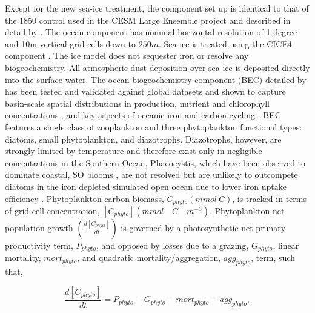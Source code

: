 Except for the new sea-ice treatment, the component set up is identical to that of the 1850 control used in the CESM Large Ensemble project and described in detail by \textcite{KayCommunityEarthSystem2014}. The ocean component has nominal horizontal resolution of 1 degree and 10m vertical grid cells down to $250m$. Sea ice is treated using the CICE4 component \parencite{HunkeCICEAlamosSea2008}. The ice model does not sequester iron or resolve any biogeochemistry. All atmospheric dust deposition over sea ice is deposited directly into the surface water.  
The ocean biogeochemistry component (BEC) detailed by \parencite{MooreMarineEcosystemDynamics2013} has been tested and validated against global datasets and shown to capture basin-scale spatial distributions in production, nutrient and chlorophyll concentrations 
\parencite{DoneySkillmetricsconfronting2009g, MooreUpperoceanecosystem2004,MooreMarineEcosystemDynamics2013,MooreProcessespatternsoceanic2013}, and key aspects of oceanic iron \parencite{MooreSedimentarymineraldust2008} and carbon cycling \parencite{LimaDynamicsparticulateorganic2014, LongTwentiethCenturyOceanicCarbon2013,MooreMarineEcosystemDynamics2013}. BEC features a single class of zooplankton and three phytoplankton functional types: diatoms, small phytoplankton, and diazotrophs. Diazotrophs, however, are strongly limited by temperature and therefore exist only in negligible concentrations in the Southern Ocean. Phaeocystis, which have been observed to dominate coastal, SO blooms \parencite{SchoemannPhaeocystisbloomsglobal2005}, are not resolved but are unlikely to outcompete diatoms in the iron depleted simulated open ocean due to lower iron uptake efficiency \parencite{WangIncorporatingPhaeocystisSouthern2011a}. Phytoplankton carbon biomass, $C_{phyto} (mmol \: C)$, is tracked in terms of grid cell concentration, $[C_{phyto}] (mmol \quad C \quad m^{-3})$. Phytoplankton net population growth $(\frac{d[C_{phyot}]}{dt})$ is governed by a photosynthetic net primary productivity term, $P_{phyto}$, and opposed by losses due to a grazing, $G_{phyto}$, linear mortality, $mort_{phyto}$, and quadratic mortality/aggregation, $agg_{phyto}$, term, such that,

\begin{equation}
    \frac{d[C_{phyto}]}{dt} = P_{phyto}-G_{phyto}-mort_{phyto}-agg_{phyto},
\end{equation}


